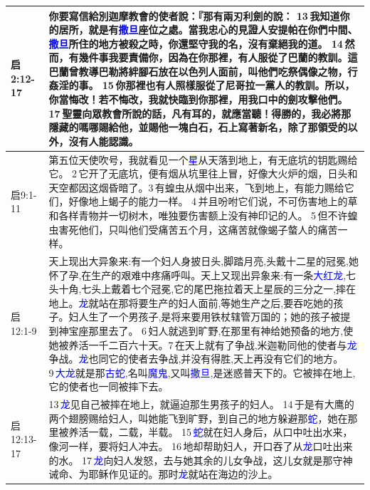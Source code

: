 \begin{table}[H]
\begin{tabular}{p{1.6cm}|p{}}
启2:12-17&你要寫信給別迦摩教會的使者說：『那有兩刃利劍的說： 13 我知道你的居所，就是有\textcolor{blue}{撒旦}座位之處。當我忠心的見證人安提帕在你們中間、\textcolor{blue}{撒旦}所住的地方被殺之時，你還堅守我的名，沒有棄絕我的道。 14 然而，有幾件事我要責備你，因為在你那裡，有人服從了巴蘭的教訓。這巴蘭曾教導巴勒將絆腳石放在以色列人面前，叫他們吃祭偶像之物，行姦淫的事。 15 你那裡也有人照樣服從了尼哥拉一黨人的教訓。所以，你當悔改！若不悔改，我就快臨到你那裡，用我口中的劍攻擊他們。 17 聖靈向眾教會所說的話，凡有耳的，就應當聽！得勝的，我必將那隱藏的嗎哪賜給他，並賜他一塊白石，石上寫著新名，除了那領受的以外，沒有人能認識。\\\hline


启9:1-11&第五位天使吹号，我就看见一个\textcolor{blue}{星}从天落到地上，有无底坑的钥匙赐给它。 2 它开了无底坑，便有烟从坑里往上冒，好像大火炉的烟，日头和天空都因这烟昏暗了。3 有蝗虫从烟中出来，飞到地上，有能力赐给它们，好像地上蝎子的能力一样。 4 并且吩咐它们说，不可伤害地上的草和各样青物并一切树木，唯独要伤害额上没有神印记的人。 5 但不许蝗虫害死他们，只叫他们受痛苦五个月，这痛苦就像蝎子螫人的痛苦一样。  \\\hline

启12:1-9&天上现出大异象来:有一个妇人身披日头,脚踏月亮,头戴十二星的冠冕,她怀了孕,在生产的艰难中疼痛呼叫。天上又现出异象来:有一条\textcolor{blue}{大红龙},七头十角,七头上戴着七个冠冕,它的尾巴拖拉着天上星辰的三分之一,摔在地上。\textcolor{blue}{龙}就站在那将要生产的妇人面前,等她生产之后,要吞吃她的孩子。妇人生了一个男孩子,是将来要用铁杖辖管万国的；她的孩子被提到神宝座那里去了。 6 妇人就逃到旷野,在那里有神给她预备的地方,使她被养活一千二百六十天。7 在天上就有了争战,米迦勒同他的使者与\textcolor{blue}{龙}争战。\textcolor{blue}{龙}也同它的使者去争战,并没有得胜,天上再没有它们的地方。 9 \textcolor{blue}{大龙}就是那\textcolor{blue}{古蛇},名叫\textcolor{blue}{魔鬼},又叫\textcolor{blue}{撒旦},是迷惑普天下的。它被摔在地上,它的使者也一同被摔下去。\\\hline

启12:13-17&13 \textcolor{blue}{龙}见自己被摔在地上，就逼迫那生男孩子的妇人。 14 于是有大鹰的两个翅膀赐给妇人，叫她能飞到旷野，到自己的地方躲避那\textcolor{blue}{蛇}，她在那里被养活一载，二载，半载。 15 \textcolor{blue}{蛇}就在妇人身后，从口中吐出水来，像河一样，要将妇人冲去。 16 地却帮助妇人，开口吞了从\textcolor{blue}{龙}口吐出来的水。 17 \textcolor{blue}{龙}向妇人发怒，去与她其余的儿女争战，这儿女就是那守神诫命、为耶稣作见证的。那时\textcolor{blue}{龙}就站在海边的沙上。\\\hline


\end{tabular}
\end{table}
